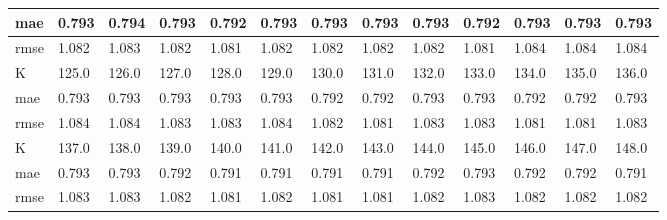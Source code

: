 \begin{appendices}
\begin{center}
\begin{tabularx}{\textwidth}{|l|X|X|X|X|X|X|X|X|X|X|X|X|}
		mae & 0.793 & 0.794 & 0.793 & 0.792 & 0.793 & 0.793 & 0.793 & 0.793 & 0.792 & 0.793 & 0.793 & 0.793 \\ \hline 
		rmse & 1.082 & 1.083 & 1.082 & 1.081 & 1.082 & 1.082 & 1.082 & 1.082 & 1.081 & 1.084 & 1.084 & 1.084 \\ \hline 
		\hline 
		K & 125.0 & 126.0 & 127.0 & 128.0 & 129.0 & 130.0 & 131.0 & 132.0 & 133.0 & 134.0 & 135.0 & 136.0 \\ \hline 
		mae & 0.793 & 0.793 & 0.793 & 0.793 & 0.793 & 0.792 & 0.792 & 0.793 & 0.793 & 0.792 & 0.792 & 0.793 \\ \hline 
		rmse & 1.084 & 1.084 & 1.083 & 1.083 & 1.084 & 1.082 & 1.081 & 1.083 & 1.083 & 1.081 & 1.081 & 1.083 \\ \hline 
		\hline 
		K & 137.0 & 138.0 & 139.0 & 140.0 & 141.0 & 142.0 & 143.0 & 144.0 & 145.0 & 146.0 & 147.0 & 148.0 \\ \hline 
		mae & 0.793 & 0.793 & 0.792 & 0.791 & 0.791 & 0.791 & 0.791 & 0.792 & 0.793 & 0.792 & 0.792 & 0.791 \\ \hline 
		rmse & 1.083 & 1.083 & 1.082 & 1.081 & 1.082 & 1.081 & 1.081 & 1.082 & 1.083 & 1.082 & 1.082 & 1.082 \\ \hline 
	\end{tabularx} 
\end{center}


\end{appendices}
